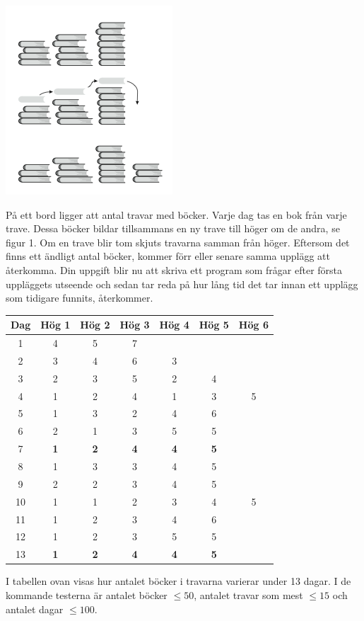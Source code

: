 
\includegraphics{Travar.png}

På ett bord ligger att antal travar med böcker. Varje dag tas en bok från varje trave. Dessa böcker bildar tillsammans en ny trave till höger om de andra, se figur 1. Om en trave blir tom skjuts travarna samman från höger. Eftersom det finns ett ändligt antal böcker, kommer förr eller senare samma upplägg att återkomma. Din uppgift blir nu att skriva ett program som frågar efter första uppläggets utseende och sedan tar reda på hur lång tid det tar innan ett upplägg som tidigare funnits, återkommer.

\begin{tabular}{|c|c|c|c|c|c|c|}
\hline
Dag&Hög 1&Hög 2&Hög 3&Hög 4&Hög 5&Hög 6\\\hline
1&4&5&7&&&\\
2&3&4&6&3&&\\
3&2&3&5&2&4&\\
4&1&2&4&1&3&5\\
5&1&3&2&4&6&\\
6&2&1&3&5&5&\\
7&\textbf{1}&\textbf{2}&\textbf{4}&\textbf{4}&\textbf{5}&\\
8&1&3&3&4&5&\\
9&2&2&3&4&5&\\
10&1&1&2&3&4&5\\
11&1&2&3&4&6&\\
12&1&2&3&5&5&\\
13&\textbf{1}&\textbf{2}&\textbf{4}&\textbf{4}&\textbf{5}&\\\hline
\end{tabular}

I tabellen ovan visas hur antalet böcker i travarna varierar under 13 dagar. I de kommande testerna är antalet böcker $ \le 50$, antalet travar som mest $ \le 15$ och antalet dagar $ \le 100$.

